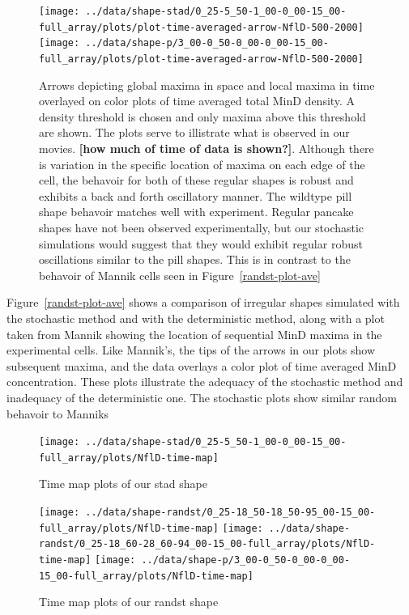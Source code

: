 \documentclass[letterpaper,twocolumn,amsmath,amssymb,pre]{revtex4-1}
\newcommand{\red}[1]{{\bf \color{red} #1}}
\newcommand{\fixme}[1]{\red{[#1]}}
\begin{document}
\begin{figure}
  \texttt{[image: ../data/shape-stad/0\_25-5\_50-1\_00-0\_00-15\_00-full\_array/plots/plot-time-averaged-arrow-NflD-500-2000]}
  \texttt{[image: ../data/shape-p/3\_00-0\_50-0\_00-0\_00-15\_00-full\_array/plots/plot-time-averaged-arrow-NflD-500-2000]}
  \caption{Arrows depicting global maxima in space and local maxima in
    time overlayed on color plots of time averaged total MinD
    density. A density threshold is chosen and only maxima above this
    threshold are shown. The plots serve to illistrate what is
    observed in our movies. \fixme{how much of time of data is
      shown?}.  Although there is variation in the specific location
    of maxima on each edge of the cell, the behavoir for both of these
    regular shapes is robust and exhibits a back and forth oscillatory
    manner.  The wildtype pill shape behavoir matches well with
    experiment.  Regular pancake shapes have not been observed
    experimentally, but our stochastic simulations would suggest that
    they would exhibit regular robust oscillations similar to the pill
    shapes.  This is in contrast to the behavoir of Mannik cells seen
    in Figure~\ref{randst-plot-ave}}
  \label{arrow-pill-stadium}
\end{figure}



Figure~\ref{randst-plot-ave} shows a comparison of irregular shapes
simulated with the stochastic method and with the deterministic
method, along with a plot taken from Mannik showing the location of
sequential MinD maxima in the experimental cells.  Like Mannik's, the
tips of the arrows in our plots show subsequent maxima, and the data
overlays a color plot of time averaged MinD concentration.  These
plots illustrate the adequacy of the stochastic method and inadequacy
of the deterministic one.  The stochastic plots show similar random
behavoir to Manniks

\begin{figure}
  \texttt{[image: ../data/shape-stad/0\_25-5\_50-1\_00-0\_00-15\_00-full\_array/plots/NflD-time-map]}
  \caption{Time map plots of our stad shape}
  \label{time-maps-stad}
\end{figure}


\begin{figure}
  \texttt{[image: ../data/shape-randst/0\_25-18\_50-18\_50-95\_00-15\_00-full\_array/plots/NflD-time-map]}
  \texttt{[image: ../data/shape-randst/0\_25-18\_60-28\_60-94\_00-15\_00-full\_array/plots/NflD-time-map]}
  \texttt{[image: ../data/shape-p/3\_00-0\_50-0\_00-0\_00-15\_00-full\_array/plots/NflD-time-map]}
  \caption{Time map plots of our randst shape}
  \label{time-maps-randst}
\end{figure}
\end{document}
